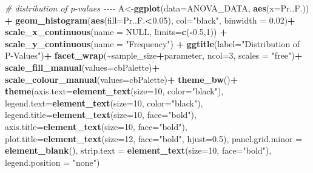 \documentclass[
]{article}
\newenvironment{Shaded}{\begin{snugshade}}{\end{snugshade}}
\newcommand{\AttributeTok}[1]{\textcolor[rgb]{0.13,0.29,0.53}{#1}}
\newcommand{\CommentTok}[1]{\textcolor[rgb]{0.56,0.35,0.01}{\textit{#1}}}
\newcommand{\ConstantTok}[1]{\textcolor[rgb]{0.56,0.35,0.01}{#1}}
\newcommand{\DecValTok}[1]{\textcolor[rgb]{0.00,0.00,0.81}{#1}}
\newcommand{\FloatTok}[1]{\textcolor[rgb]{0.00,0.00,0.81}{#1}}
\newcommand{\FunctionTok}[1]{\textcolor[rgb]{0.13,0.29,0.53}{\textbf{#1}}}
\newcommand{\NormalTok}[1]{#1}
\newcommand{\OtherTok}[1]{\textcolor[rgb]{0.56,0.35,0.01}{#1}}
\newcommand{\SpecialCharTok}[1]{\textcolor[rgb]{0.81,0.36,0.00}{\textbf{#1}}}
\newcommand{\StringTok}[1]{\textcolor[rgb]{0.31,0.60,0.02}{#1}}
\begin{document}
\begin{Shaded}
\begin{Highlighting}[]
\CommentTok{\# distribution of p{-}values {-}{-}{-}{-}}
\NormalTok{A}\OtherTok{\textless{}{-}}\FunctionTok{ggplot}\NormalTok{(}\AttributeTok{data=}\NormalTok{ANOVA\_DATA, }\FunctionTok{aes}\NormalTok{(}\AttributeTok{x=}\NormalTok{Pr..F.)) }\SpecialCharTok{+}
  \FunctionTok{geom\_histogram}\NormalTok{(}\FunctionTok{aes}\NormalTok{(}\AttributeTok{fill=}\NormalTok{Pr..F.}\SpecialCharTok{\textless{}}\FloatTok{0.05}\NormalTok{), }\AttributeTok{col=}\StringTok{"black"}\NormalTok{, }\AttributeTok{binwidth =} \FloatTok{0.02}\NormalTok{)}\SpecialCharTok{+}
  \FunctionTok{scale\_x\_continuous}\NormalTok{(}\AttributeTok{name =} \ConstantTok{NULL}\NormalTok{, }\AttributeTok{limits=}\FunctionTok{c}\NormalTok{(}\SpecialCharTok{{-}}\FloatTok{0.5}\NormalTok{,}\DecValTok{1}\NormalTok{)) }\SpecialCharTok{+}
  \FunctionTok{scale\_y\_continuous}\NormalTok{(}\AttributeTok{name =} \StringTok{"Frequency"}\NormalTok{) }\SpecialCharTok{+}
  \FunctionTok{ggtitle}\NormalTok{(}\AttributeTok{label=}\StringTok{"Distribution of P{-}Values"}\NormalTok{)}\SpecialCharTok{+}
  \FunctionTok{facet\_wrap}\NormalTok{(}\SpecialCharTok{\textasciitilde{}}\NormalTok{sample\_size}\SpecialCharTok{+}\NormalTok{parameter, }\AttributeTok{ncol=}\DecValTok{3}\NormalTok{, }\AttributeTok{scales =} \StringTok{"free"}\NormalTok{)}\SpecialCharTok{+}
  \FunctionTok{scale\_fill\_manual}\NormalTok{(}\AttributeTok{values=}\NormalTok{cbPalette)}\SpecialCharTok{+}
  \FunctionTok{scale\_colour\_manual}\NormalTok{(}\AttributeTok{values=}\NormalTok{cbPalette)}\SpecialCharTok{+}
  \FunctionTok{theme\_bw}\NormalTok{()}\SpecialCharTok{+}
  \FunctionTok{theme}\NormalTok{(}\AttributeTok{axis.text=}\FunctionTok{element\_text}\NormalTok{(}\AttributeTok{size=}\DecValTok{10}\NormalTok{, }\AttributeTok{color=}\StringTok{"black"}\NormalTok{),}
        \AttributeTok{legend.text=}\FunctionTok{element\_text}\NormalTok{(}\AttributeTok{size=}\DecValTok{10}\NormalTok{, }\AttributeTok{color=}\StringTok{"black"}\NormalTok{),}
        \AttributeTok{legend.title=}\FunctionTok{element\_text}\NormalTok{(}\AttributeTok{size=}\DecValTok{10}\NormalTok{, }\AttributeTok{face=}\StringTok{"bold"}\NormalTok{),}
        \AttributeTok{axis.title=}\FunctionTok{element\_text}\NormalTok{(}\AttributeTok{size=}\DecValTok{10}\NormalTok{, }\AttributeTok{face=}\StringTok{"bold"}\NormalTok{),}
        \AttributeTok{plot.title=}\FunctionTok{element\_text}\NormalTok{(}\AttributeTok{size=}\DecValTok{12}\NormalTok{, }\AttributeTok{face=}\StringTok{"bold"}\NormalTok{, }\AttributeTok{hjust=}\FloatTok{0.5}\NormalTok{),}
        \AttributeTok{panel.grid.minor =} \FunctionTok{element\_blank}\NormalTok{(),}
        \AttributeTok{strip.text =} \FunctionTok{element\_text}\NormalTok{(}\AttributeTok{size=}\DecValTok{10}\NormalTok{, }\AttributeTok{face=}\StringTok{"bold"}\NormalTok{),}
        \AttributeTok{legend.position =} \StringTok{"none"}\NormalTok{)}


\end{Highlighting}
\end{Shaded}
\end{document}
